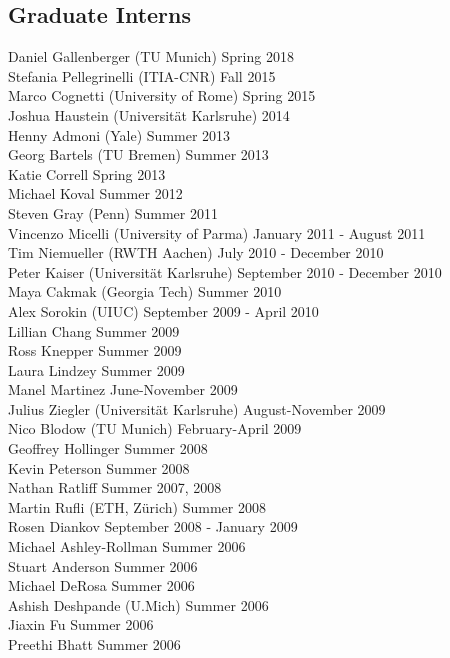\subsection{Graduate Interns}
\noindent
Daniel Gallenberger (TU Munich) \hfill Spring 2018\\
Stefania Pellegrinelli (ITIA-CNR) \hfill Fall 2015\\
Marco Cognetti (University of Rome) \hfill Spring 2015\\
Joshua Haustein (Universit\"at Karlsruhe) \hfill 2014\\
Henny Admoni (Yale) \hfill Summer 2013\\
Georg Bartels (TU Bremen) \hfill Summer 2013\\
Katie Correll  \hfill Spring 2013\\
Michael Koval  \hfill Summer 2012\\
Steven Gray (Penn) \hfill Summer 2011\\
Vincenzo Micelli (University of Parma) \hfill January 2011 - August 2011\\
Tim Niemueller (RWTH Aachen) \hfill July 2010 - December 2010\\ 
Peter Kaiser (Universit\"at Karlsruhe) \hfill September 2010 - December 2010\\ 
Maya Cakmak (Georgia Tech) \hfill Summer 2010\\ 
Alex Sorokin (UIUC) \hfill September 2009 - April 2010\\ 
Lillian Chang  \hfill Summer 2009\\
Ross Knepper  \hfill Summer 2009\\
Laura Lindzey  \hfill Summer 2009\\
Manel Martinez  \hfill June-November 2009\\
Julius Ziegler (Universit\"at Karlsruhe) \hfill August-November 2009\\
Nico Blodow (TU Munich) \hfill February-April 2009\\
Geoffrey Hollinger  \hfill Summer 2008\\
Kevin Peterson  \hfill Summer 2008\\
Nathan Ratliff  \hfill Summer 2007, 2008\\
Martin Rufli (ETH, Z\"urich) \hfill Summer 2008\\
Rosen Diankov  \hfill September 2008 - January 2009\\
Michael Ashley-Rollman  \hfill Summer 2006\\
Stuart Anderson  \hfill Summer 2006\\
Michael DeRosa  \hfill Summer 2006\\
Ashish Deshpande (U.Mich) \hfill Summer 2006\\
Jiaxin Fu  \hfill Summer 2006\\
Preethi Bhatt  \hfill Summer 2006\\

